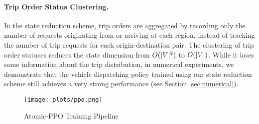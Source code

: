 \paragraph{Trip Order Status Clustering.} In the state reduction scheme, trip orders are aggregated by recording only the number of requests originating from or arriving at each region, instead of tracking the number of trip requests for each origin-destination pair.
The clustering of trip order statuses reduces the state dimension from $O(\vert V \vert^2)$ to $O(\vert V \vert)$. While it loses some information about the trip distribution, in numerical experiments, we demonstrate that the vehicle dispatching policy trained using our state reduction scheme still achieves a very strong performance (see Section \ref{sec:numerical}). 

\begin{figure}
    \centering
    \texttt{[image: plots/ppo.png]}
    \caption{Atomic-PPO Training Pipeline}
    \label{fig:ppo}
\end{figure}

